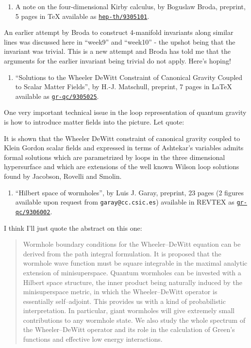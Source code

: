 \documentclass{article}
\def\tightlist{}
\begin{document}
\begin{enumerate}
\def\labelenumi{\arabic{enumi})}
\setcounter{enumi}{7}
\tightlist
\item
  A note on the four-dimensional Kirby calculus, by Boguslaw Broda,
  preprint, 5 pages in TeX available as
  \href{http://xxx.lanl.gov/abs/hep-th/9305101}{\texttt{hep-th/9305101}}.
\end{enumerate}

An earlier attempt by Broda to construct 4-manifold invariants along
similar lines was discussed here in ``week9'' and ``week10'' - the
upshot being that the invariant was trivial. This is a new attempt and
Broda has told me that the arguments for the earlier invariant being
trivial do not apply. Here's hoping!

\begin{enumerate}
\def\labelenumi{\arabic{enumi})}
\setcounter{enumi}{8}
\tightlist
\item
  ``Solutions to the Wheeler DeWitt Constraint of Canonical Gravity
  Coupled to Scalar Matter Fields'', by H.-J. Matschull, preprint, 7
  pages in LaTeX available as
  \href{http://xxx.lanl.gov/abs/gr-qc/9305025}{\texttt{gr-qc/9305025}}.
\end{enumerate}

One very important technical issue in the loop representation of quantum
gravity is how to introduce matter fields into the picture. Let quote:

It is shown that the Wheeler DeWitt constraint of canonical gravity
coupled to Klein Gordon scalar fields and expressed in terms of
Ashtekar's variables admits formal solutions which are parametrized by
loops in the three dimensional hypersurface and which are extensions of
the well known Wilson loop solutions found by Jacobson, Rovelli and
Smolin.

\begin{enumerate}
\def\labelenumi{\arabic{enumi})}
\setcounter{enumi}{9}
\tightlist
\item
  ``Hilbert space of wormholes'', by Luis J. Garay, preprint, 23 pages
  (2 figures available upon request from \texttt{garay@cc.csic.es})
  available in REVTEX as
  \href{http://xxx.lanl.gov/abs/gr-qc/9306002}{\texttt{gr-qc/9306002}}.
\end{enumerate}

I think I'll just quote the abstract on this one:

\begin{quote}
Wormhole boundary conditions for the Wheeler--DeWitt equation can be
derived from the path integral formulation. It is proposed that the
wormhole wave function must be square integrable in the maximal analytic
extension of minisuperspace. Quantum wormholes can be invested with a
Hilbert space structure, the inner product being naturally induced by
the minisuperspace metric, in which the Wheeler--DeWitt operator is
essentially self--adjoint. This provides us with a kind of probabilistic
interpretation. In particular, giant wormholes will give extremely small
contributions to any wormhole state. We also study the whole spectrum of
the Wheeler--DeWitt operator and its role in the calculation of Green's
functions and effective low energy interactions.
\end{quote}
\end{document}
